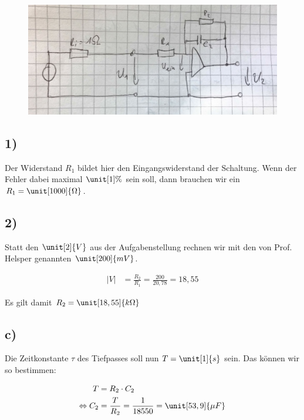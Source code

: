 \begin{figure}[h]
	\centering
	\includegraphics[scale=0.1]{A5_2_1.jpg}
\end{figure}


\subsection*{1)}

Der Widerstand $R_1$ bildet hier den Eingangswiderstand der Schaltung. Wenn der Fehler dabei maximal $\unit[1]{\%}$ sein soll, dann brauchen wir ein $R_1 = \unit[1000]{\Omega}$.

\subsection*{2)}

Statt den $\unit[2]{V}$ aus der Aufgabenstellung rechnen wir mit den von Prof. Helsper genannten $\unit[200]{mV}$.

\begin{align*}
|V| &= \frac{R_2}{R_1} = \frac{200}{20,78} = 18,55
\end{align*}

Es gilt damit $R_2 = \unit[18,55]{k \Omega}$

\subsection*{c)}

Die Zeitkonstante $\tau$ des Tiefpasses soll nun $T = \unit[1]{s}$ sein. Das können wir so bestimmen:

\begin{align*}
T &= R_2 \cdot C_2 \\
\Leftrightarrow C_2 &= \frac{T}{R_2} = \frac{1}{18550} = \unit[53,9]{\mu F}
\end{align*}












